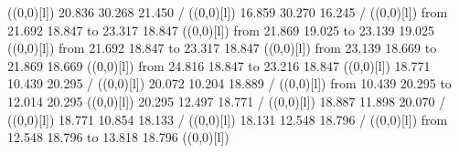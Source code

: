 {{}%
%
%
\linethickness=1pt
\setplotsymbol ({\makebox(0,0)[l]{\tencirc{}}})
{\color[rgb]{0,0,0} 20.836 30.268 21.450 /
}%
%
%
\linethickness=1pt
\setplotsymbol ({\makebox(0,0)[l]{\tencirc{}}})
{\color[rgb]{0,0,0} 16.859 30.270 16.245 /
}%
%
%
\linethickness=1pt
\setplotsymbol ({\makebox(0,0)[l]{\tencirc{}}})
{\color[rgb]{0,0,0}\putrule from 21.692 18.847 to 23.317 18.847
}%
%
%
\linethickness=1pt
\setplotsymbol ({\makebox(0,0)[l]{\tencirc{}}})
{\color[rgb]{0,0,0}\putrule from 21.869 19.025 to 23.139 19.025
}%
%
%
\linethickness=1pt
\setplotsymbol ({\makebox(0,0)[l]{\tencirc{}}})
{\color[rgb]{0,0,0}\putrule from 21.692 18.847 to 23.317 18.847
}%
%
%
\linethickness=1pt
\setplotsymbol ({\makebox(0,0)[l]{\tencirc{}}})
{\color[rgb]{0,0,0}\putrule from 23.139 18.669 to 21.869 18.669
}%
%
%
\linethickness=1pt
\setplotsymbol ({\makebox(0,0)[l]{\tencirc{}}})
{\color[rgb]{0,0,0}\putrule from 24.816 18.847 to 23.216 18.847
}%
%
%
\linethickness=1pt
\setplotsymbol ({\makebox(0,0)[l]{\tencirc{}}})
{\color[rgb]{0,0,0} 18.771 10.439 20.295 /
}%
%
%
\linethickness=1pt
\setplotsymbol ({\makebox(0,0)[l]{\tencirc{}}})
{\color[rgb]{0,0,0} 20.072 10.204 18.889 /
}%
%
%
\linethickness=1pt
\setplotsymbol ({\makebox(0,0)[l]{\tencirc{}}})
{\color[rgb]{0,0,0}\putrule from 10.439 20.295 to 12.014 20.295
}%
%
%
\linethickness=1pt
\setplotsymbol ({\makebox(0,0)[l]{\tencirc{}}})
{\color[rgb]{0,0,0} 20.295 12.497 18.771 /
}%
%
%
\linethickness=1pt
\setplotsymbol ({\makebox(0,0)[l]{\tencirc{}}})
{\color[rgb]{0,0,0} 18.887 11.898 20.070 /
}%
%
%
\linethickness=1pt
\setplotsymbol ({\makebox(0,0)[l]{\tencirc{}}})
{\color[rgb]{0,0,0} 18.771 10.854 18.133 /
}%
%
%
\linethickness=1pt
\setplotsymbol ({\makebox(0,0)[l]{\tencirc{}}})
{\color[rgb]{0,0,0} 18.131 12.548 18.796 /
}%
%
%
\linethickness=1pt
\setplotsymbol ({\makebox(0,0)[l]{\tencirc{}}})
{\color[rgb]{0,0,0}\putrule from 12.548 18.796 to 13.818 18.796
}%
%
%
\linethickness=1pt
\setplotsymbol ({\makebox(0,0)[l]{\tencirc{}}})
}
